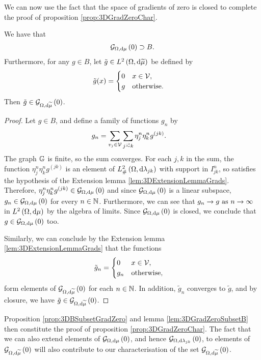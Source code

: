 We can now use the fact that the space of gradients of zero is closed to complete the proof of proposition \ref{prop:3DGradZeroChar}.
\begin{prop} \label{prop:3DBSubsetGradZero}
	We have that
	\begin{align*}
		\mathcal{G}_{ \Omega, \mathrm{d}\mu}\left( 0 \right) \supset B.
	\end{align*}
	Furthermore, for any $g\in B$, let $\tilde{g}\in L^{2}\left( \Omega,\mathrm{d} \widetilde{\mu} \right)$ be defined by
	\begin{align*}
		\tilde{g}(x) &= \begin{cases} 0 & x\in\mathcal{V}, \\ g & \mathrm{otherwise}. \end{cases}
	\end{align*}
	Then $\tilde{g}\in\mathcal{G}_{ \Omega, \mathrm{d}\widetilde{\mu}}\left( 0 \right)$.
\end{prop}
\begin{proof}
	Let $g\in B$, and define a family of functions $g_n$ by
	\begin{align*}
		g_n &= \sum_{v_j\in\vertSet}\sum_{j\conLeft k}\eta_j^n \eta_k^n g^{(jk)}.
	\end{align*}
	The graph $\mathbb{G}$ is finite, so the sum converges.
	For each $j,k$ in the sum, the function $\eta_j^n \eta_k^n g^{(jk)}$ is an element of $L^2_{\#}\left( \Omega,\mathrm{d} \lambda_{jk} \right)$ with support in $I_{jk}^n$, so satisfies the hypothesis of the Extension lemma \ref{lem:3DExtensionLemmaGrads}.
	Therefore, $\eta_j^n \eta_k^n g^{(jk)}\in\mathcal{G}_{ \Omega, \mathrm{d}\mu}\left( 0 \right)$ and since $\mathcal{G}_{ \Omega, \mathrm{d}\mu}\left( 0 \right)$ is a linear subspace, $g_n\in\mathcal{G}_{ \Omega, \mathrm{d}\mu}\left( 0 \right)$ for every $n\in\mathbb{N}$.
	Furthermore, we can see that $g_n\rightarrow g \ \text{as} \ n \rightarrow\infty$ in $L^{2}\left( \Omega,\mathrm{d} \mu \right)$ by the algebra of limits.
	Since $\mathcal{G}_{ \Omega, \mathrm{d}\mu}\left( 0 \right)$ is closed, we conclude that $g\in\mathcal{G}_{ \Omega, \mathrm{d}\mu}\left( 0 \right)$ too.
	
	Similarly, we can conclude by the Extension lemma \ref{lem:3DExtensionLemmaGrads} that the functions
	\begin{align*}
		\tilde{g}_n &= \begin{cases} 0 & x\in\mathcal{V}, \\ g_n & \mathrm{otherwise}, \end{cases}
	\end{align*}
	form elements of $\mathcal{G}_{ \Omega, \mathrm{d}\widetilde{\mu}}\left( 0 \right)$ for each $n\in\mathbb{N}$.
	In addition, $\tilde{g}_n$ converges to $\tilde{g}$, and by closure, we have $\tilde{g}\in\mathcal{G}_{ \Omega, \mathrm{d}\widetilde{\mu}}\left( 0 \right)$.
\end{proof}
Proposition \ref{prop:3DBSubsetGradZero} and lemma \ref{lem:3DGradZeroSubsetB} then constitute the proof of proposition \ref{prop:3DGradZeroChar}.
The fact that we can also extend elements of $\mathcal{G}_{ \Omega, \mathrm{d}\mu}\left( 0 \right)$, and hence $\mathcal{G}_{ \Omega, \mathrm{d}\lambda_{jk}}\left( 0 \right)$, to elements of $\mathcal{G}_{ \Omega, \mathrm{d}\widetilde{\mu}}\left( 0 \right)$ will also contribute to our characterisation of the set $\mathcal{G}_{ \Omega, \mathrm{d}\widetilde{\mu}}\left( 0 \right)$.

